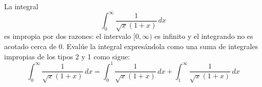 \item La integral
    \[ \int_{0}^{\infty} \frac{1}{\sqrt{x}(1 + x)} \, dx \]
    es impropia por dos razones: el intervalo $[0, \infty)$ es infinito y el integrando no es acotado cerca de 0. Evalúe la integral expresándola como una suma de integrales impropias de los tipos 2 y 1 como sigue:
    \[ \int_{0}^{\infty} \frac{1}{\sqrt{x}(1 + x)} \, dx = \int_{0}^{1} \frac{1}{\sqrt{x}(1 + x)} \, dx + \int_{1}^{\infty} \frac{1}{\sqrt{x}(1 + x)} \, dx \]
